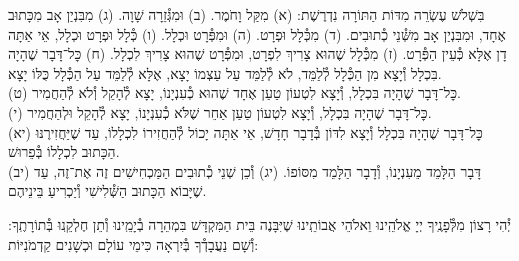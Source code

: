 \documentclass[twoside, openany, parskip=half, 11pt]{book}
\begin{document}
בִּשְׁלֹשׁ עֶשְׂרֵה מִדּוֹת הַתּוֹרָה נִדְרֶשֶׁת:\hfill \break
(א) מִקַּל וָחֹמֶר.\hfill \break
(ב) וּמִגְּ֯זֵרָה שָׁוָה.\hfill \break
(ג) מִבִּנְיַן אָב מִכָּתוּב אֶחָד, וּמִבִּנְיַן אָב מִשְּׁ֯נֵי כְ֯תוּבִים.\hfill \break
(ד) מִכְּ֯לָל וּפְרָט.\hfill \break
(ה) וּמִפְּ֯רָט וּכְלָל.\hfill \break
(ו) כְּ֯לָל וּפְרָט וּכְלָל, אֵי אַתָּה דָן אֶלָּא כְּ֯עֵין הַפְּ֯רָט.\hfill \break
(ז) מִכְּ֯לָל שֶׁהוּא צָרִיךְ לִפְרָט, וּמִפְּ֯רָט שֶׁהוּא צָרִיךְ לִכְלָל.\hfill \break
(ח) כׇּל־דָּבָר שֶׁהָיָה בִּכְלָל וְ֯יָצָא מִן הַכְּ֯לָל לְ֯לַמֵּד, לֹא לְ֯לַמֵּד עַל עַצְמוֹ יָצָא, אֶלָּא לְ֯לַמֵּד עַל הַכְּ֯לָל כֻּלּוֹ יָצָא. \\
(ט) כׇּל־דָּבָר שֶׁהָיָה בִּכְלָל, וְ֯יָצָא לִטְעוֹן טַעַן אֶחָד שֶׁהוּא כְ֯עִנְיָנוֹ, יָצָא לְ֯הָקֵל וְ֯לֹא לְ֯הַחֲמִיר. \\
(י) כׇּל־דָּבָר שֶׁהָיָה בִּכְלָל, וְ֯יָצָא לִטְעוֹן טַעַן אַחֵר שֶׁלֹּא כְ֯עִנְיָנוֹ, יָצָא לְ֯הָקֵל וּלְהַחֲמִיר. \\
(יא) כׇּל־דָּבָר שֶׁהָיָה בִּכְלָל וְ֯יָצָא לִדּוֹן בְּ֯דָבָר חָדָשׁ, אֵי אַתָּה יָכוֹל לְ֯הַחֲזִירוֹ לִכְלָלוֹ, עַד שֶׁיַּחֲזִירֶנּוּ הַכָּתוּב לִכְלָלוֹ בְּ֯פֵרוּשׁ. \\
(יב) דָּבָר הַלָּמֵד מֵעִנְיָנוֹ, וְ֯דָבָר הַלָּמֵד מִסּוֹפוֹ.\hfill \break
(יג) וְ֯כֵן שְׁנֵי כְ֯תוּבִים הַמַּכְחִישִׁים זֶה אֶת־זֶה, עַד שֶׁיָּבוֹא הַכָּתוּב הַשְּׁ֯לִישִׁי וְ֯יַכְרִיעַ בֵּינֵיהֶם.

יְ֯הִי רָצוֹן מִלְּ֯פָנֶֽיךָ יְיָ אֱלֹהֵֽינוּ וֵאלֹהֵי אֲבוֹתֵֽינוּ שֶׁיִּבָּנֶה בֵּית הַמִּקְדָּשׁ בִּמְהֵרָה בְ֯יָמֵֽינוּ וְ֯תֵן חֶלְקֵֽנוּ בְּ֯תוֹרָתֶֽךָ: וְ֯שָׁם נַעֲבָדְ֯ךָ בְּ֯יִרְאָה כִּימֵי עוֹלָם וּכְשָׁנִים קַדְמֹנִיּוֹת:


\rabbiskaddish
\end{document}
